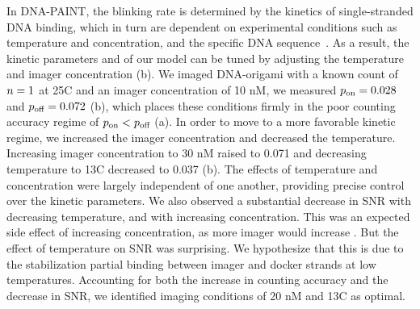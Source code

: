 In DNA-PAINT, the blinking rate is determined by the kinetics of single-stranded DNA binding,
which in turn are dependent on experimental conditions such as temperature and concentration, 
and the specific DNA sequence~\citep{jungmann_single-molecule_2010}.
	As a result, the kinetic parameters \pon and \poff of our model can be 
	tuned by adjusting the temperature and imager concentration (b).
	We imaged DNA-origami with a known count of $n=1$ at 25\textdegree C and an 
	imager concentration of 10 nM, we measured $p_\text{on}=0.028$ and $p_\text{off}=0.072$ 
	(b),
	which places these conditions firmly in the poor counting 
	accuracy regime of $p_\text{on} < p_\text{off}$ (a). %
	In order to move to a more favorable kinetic regime, 
	we increased the imager concentration and decreased the temperature.
	Increasing imager concentration to 30 nM raised \pon to 0.071 and 
	decreasing temperature to 13\textdegree C decreased \poff to 0.037 
	(b).
	The effects of temperature and concentration were largely independent 
	of one another, providing precise control over the kinetic parameters. %
	We also observed a substantial decrease in SNR with decreasing temperature, 
	and with increasing concentration. 
	This was an expected side effect of increasing concentration, as more imager would increase \rb.
	But the effect of temperature on SNR was surprising. 
	We hypothesize that this is due to the stabilization partial 
	binding between imager and docker strands at low temperatures.
	Accounting for both the increase in counting accuracy and the decrease 
	in SNR, we identified imaging conditions of 20 nM and 13\textdegree C as optimal.

